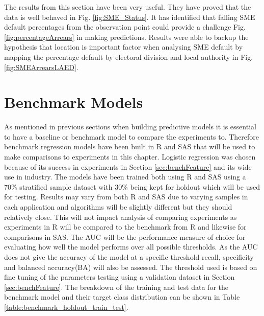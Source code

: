  
The results from this section have been very useful. They have proved that the data is well behaved in Fig. \ref{fig:SME_Status}. It has identified that falling SME default percentages from the observation point could provide a challenge Fig. \ref{fig:percentageArrears} in making predictions. Results were able to backup the hypothesis that location is important factor when analysing SME default by mapping the percentage default by electoral division and local authority in Fig. \ref{fig:SMEArrearsLAED}. 


\section{Benchmark Models}\label{sec:benchModels}
As mentioned in previous sections when building predictive models it is essential to have a baseline or benchmark model to compare the experiments to. Therefore benchmark regression models have been built in R and SAS that will be used to make comparisons to experiments in this chapter. Logistic regression was chosen because of its success in experiments in Section \ref{sec:benchFeature} and its wide use in industry. The models have been trained both using R and SAS using a 70\% stratified sample dataset with 30\% being kept for holdout which will be used for testing. Results may vary from both R and SAS due to varying samples in each application and algorithms will be slightly different but they should relatively close. This will not impact analysis of comparing experiments as experiments in R will be compared to the benchmark from R and likewise for comparisons in SAS. The AUC will be the performance measure of choice for evaluating how well the model performs over all possible thresholds. As the AUC does not give the accuracy of the model at a specific threshold recall, specificity and balanced accuracy(BA) will also be assessed. The threshold used is based on fine tuning of the parameters testing using a validation dataset in Section \ref{sec:benchFeature}. The breakdown of the training and test data for the benchmark model and their target class distribution can be shown in Table \ref{table:benchmark_holdout_train_test}.


